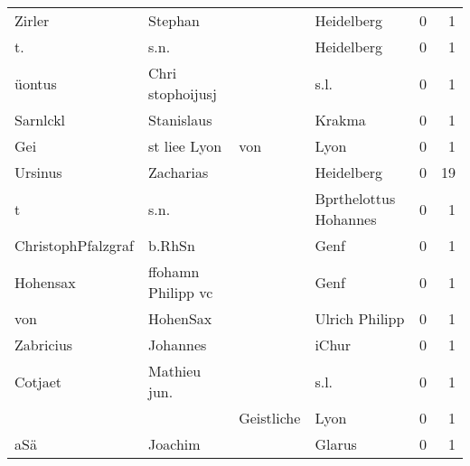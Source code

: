 \begin{tabular}{llllrr}
                   Zirler &                            Stephan &             &                                  Heidelberg &          0 &         1 \\
                       t. &                               s.n. &             &                                  Heidelberg &          0 &         1 \\
                   üontus &                   Chri stophoijusj &             &                                        s.l. &          0 &         1 \\
                 Sarnlckl &                         Stanislaus &             &                                      Krakma &          0 &         1 \\
                      Gei &                      st liee  Lyon &         von &                                        Lyon &          0 &         1 \\
                  Ursinus &                          Zacharias &             &                                  Heidelberg &          0 &        19 \\
                        t &                               s.n. &             &                       Bprthelottus Hohannes &          0 &         1 \\
       ChristophPfalzgraf &                             b.RhSn &             &                                        Genf &          0 &         1 \\
                 Hohensax &                 ffohamn Philipp vc &             &                                        Genf &          0 &         1 \\
                      von &                           HohenSax &             &                              Ulrich Philipp &          0 &         1 \\
                Zabricius &                           Johannes &             &                                       iChur &          0 &         1 \\
                  Cotjaet &                       Mathieu jun. &             &                                        s.l. &          0 &         1 \\
                          &                                    &  Geistliche &                                        Lyon &          0 &         1 \\
                      aSä &                            Joachim &             &                                      Glarus &          0 &         1 \\

\end{tabular}
